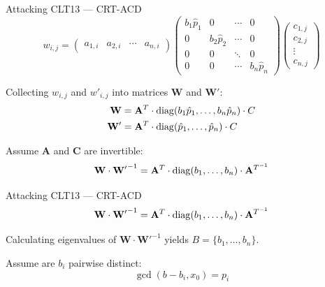 \documentclass[english]{beamer}
\begin{document}
    \begin{frame}{Attacking CLT13 --- CRT-ACD}
        \begin{equation*}
            w_{i,j} =
            \begin{pmatrix}
                a_{1, i} & a_{2, i} & \cdots & a_{n, i}
            \end{pmatrix}
            \begin{pmatrix}
                b_1 \hat{p}_1 & 0 & \cdots & 0 \\
                0 & b_2 \hat{p}_2 & \cdots & 0 \\
                0 & 0 & \ddots & 0 \\
                0 & 0 & \cdots & b_n \hat{p}_n
            \end{pmatrix}
            \begin{pmatrix}
                c_{1, j} \\
                c_{2, j} \\
                \vdots \\
                c_{n, j}
            \end{pmatrix}
        \end{equation*}

        Collecting $w_{i,j}$ and $w'_{i,j}$ into matrices $\mathbf{W}$ and $\mathbf{W'}$:
        \begin{align*}
            \mathbf{W} &= \mathbf{A}^T \cdot \operatorname{diag}(b_1 \hat{p}_1, \dots, b_n \hat{p}_n) \cdot C \\
            \mathbf{W'} &= \mathbf{A}^T \cdot \operatorname{diag}(\hat{p}_1, \dots, \hat{p}_n) \cdot C
        \end{align*}

        \pause
        Assume $\mathbf{A}$ and $\mathbf{C}$ are invertible:
        \begin{equation*}
            \mathbf{W} \cdot \mathbf{W'}^{-1} = \mathbf{A}^T \cdot \operatorname{diag}(b_1, \dots, b_n) \cdot \mathbf{A}^{T^{-1}}
        \end{equation*}
    \end{frame}
    \begin{frame}{Attacking CLT13 --- CRT-ACD}
        \begin{equation*}
            \mathbf{W} \cdot \mathbf{W'}^{-1} = \mathbf{A}^T \cdot \operatorname{diag}(b_1, \dots, b_n) \cdot \mathbf{A}^{T^{-1}}
        \end{equation*}

        Calculating eigenvalues of $\mathbf{W} \cdot \mathbf{W'}^{-1}$ yields $B = \{b_1, \dots, b_n\}$.

        \pause
        Assume are $b_i$ pairwise distinct:
        \begin{equation*}
            \gcd(b - b_i, x_0) = p_i
        \end{equation*}
    \end{frame}
\end{document}
